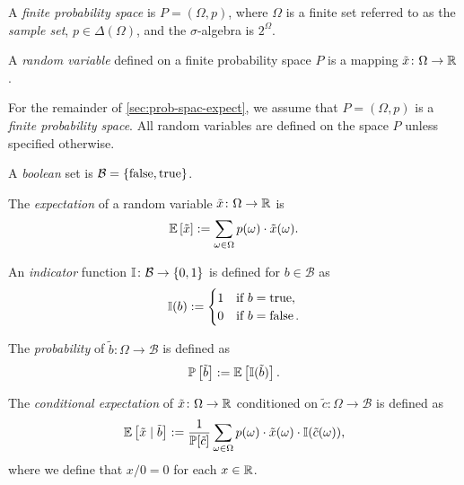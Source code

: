 \begin{definition} \label{def:probability-space}
A \emph{finite probability space} is $P = (\Omega, p)$, where $\Omega$ is a finite set referred to as the \emph{sample set}, $p\in \Delta(\Omega)$, and the $\sigma$-algebra is $2^{\Omega}$.
 \leanok
\end{definition}

\begin{definition}
A \emph{random variable} defined on a finite probability space $P$ is a mapping $\tilde{x}\colon \Omega \to \mathbb{R}$.
 \leanok
\end{definition}

For the remainder of \cref{sec:prob-spac-expect}, we assume that $P = (\Omega, p)$ is a \emph{finite probability space}. All random variables are defined on the space $P$ unless specified otherwise.

\begin{definition}
A \emph{boolean} set is $\mathcal{B} = \left\{ \operatorname{false}, \operatorname{true} \right\}$.
 \leanok
\end{definition}

\begin{definition} \label{def:expect}
The \emph{expectation} of a random variable $\tilde{x} \colon \Omega \to \mathbb{R}$ is 
\[
\mathbb{E} \left[ \tilde{x} \right] := \sum_{\omega \in \Omega } p(\omega ) \cdot \tilde{x}(\omega).
\]
 \leanok
\end{definition}

\begin{definition} \label{def:indicator}
An \emph{indicator} function $\mathbb{I} \colon \mathcal{B} \to \left\{ 0, 1 \right\}$ is defined for $b\in \mathcal{B}$ as
\[
\mathbb{I}(b) :=
\begin{cases}
1 &\text{if } b = \operatorname{true}, \\
0 &\text{if } b = \operatorname{false}.
\end{cases}
\]
 \leanok
\end{definition}

\begin{definition} \label{def:probability}
The \emph{probability} of $\tilde{b}\colon \Omega \to \mathcal{B}$ is defined as
\[
\mathbb{P}\left[ \tilde{b} \right] := \mathbb{E}\left[\mathbb{I}(\tilde{b})\right].
\]
\end{definition}

\begin{definition} \label{def:expect-cnd}
The \emph{conditional expectation} of $\tilde{x} \colon \Omega \to \mathbb{R}$ conditioned on $\tilde{c} \colon \Omega \to \mathcal{B}$ is defined as
\[
\mathbb{E} \left[ \tilde{x} \mid  \tilde{b} \right] :=
\frac{1}{\mathbb{P}[\tilde{c}]} \sum_{\omega \in \Omega } p(\omega ) \cdot \tilde{x}(\omega) \cdot \mathbb{I}(\tilde{c}(\omega)),
\]
where we define that $x / 0 = 0$ for each $x\in \mathbb{R}$.
 \leanok
\end{definition}

